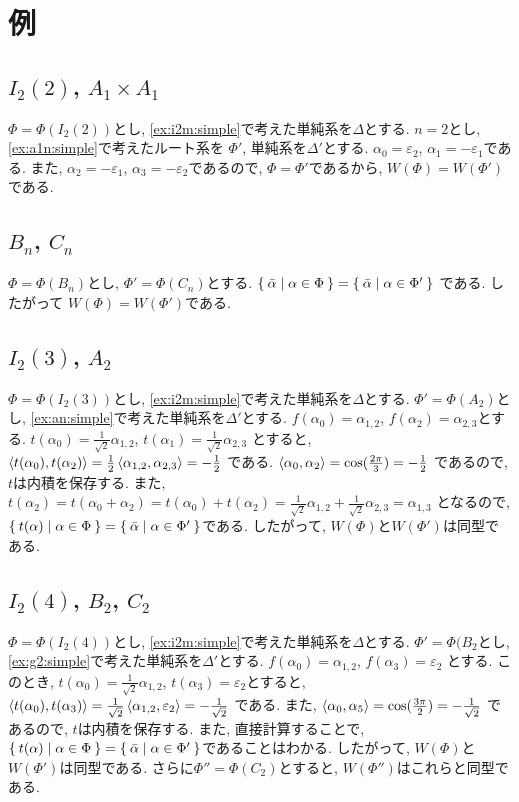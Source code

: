 \section{例}
\subsection{$I_2(2)$, $A_1\times A_1$}
$\Phi=\Phi(I_2(2))$とし,
\cref{ex:i2m:simple}で考えた単純系を$\Delta$とする.
$n=2$とし, 
\cref{ex:a1n:simple}で考えたルート系を
$\Phi'$,
単純系を$\Delta'$とする.
$\alpha_0=\varepsilon_2$,
$\alpha_1=-\varepsilon_1$である.
また,
$\alpha_2=-\varepsilon_1$,
$\alpha_3=-\varepsilon_2$であるので,
$\Phi=\Phi'$であるから, $W(\Phi)=W(\Phi')$である.

\subsection{$B_n$, $C_n$}
$\Phi=\Phi(B_n)$とし,
$\Phi'=\Phi(C_n)$とする.
$\Set{\bar\alpha|\alpha\in \Phi}=\Set{\bar\alpha|\alpha\in \Phi'}$
である.
したがって
$W(\Phi)=W(\Phi')$である.

\subsection{$I_2(3)$, $A_2$}
$\Phi=\Phi(I_2(3))$とし,
\cref{ex:i2m:simple}で考えた単純系を$\Delta$とする.
$\Phi'=\Phi(A_2)$とし,
\cref{ex:an:simple}で考えた単純系を$\Delta'$とする.
$f(\alpha_0)=\alpha_{1,2}$,
$f(\alpha_2)=\alpha_{2,3}$とする.
$t(\alpha_0)=\frac{1}{\sqrt{2}}\alpha_{1,2}$,
$t(\alpha_1)=\frac{1}{\sqrt{2}}\alpha_{2,3}$
とすると,
$\Braket{t(\alpha_0),t(\alpha_2)}=\frac{1}{2}\Braket{\alpha_{1,2},\alpha_{2,3}}=-\frac{1}{2}$
である.
$\Braket{\alpha_0,\alpha_2}=\cos(\frac{2\pi}{3})=-\frac{1}{2}$
であるので, $t$は内積を保存する.
また, $t(\alpha_{2})=t(\alpha_0+\alpha_2)=t(\alpha_0)+t(\alpha_2)=\frac{1}{\sqrt{2}}\alpha_{1,2}+\frac{1}{\sqrt{2}}\alpha_{2,3}=\alpha_{1,3}$
となるので,
$\Set{t(\alpha)|\alpha\in\Phi}=\Set{\bar\alpha|\alpha\in \Phi'}$である.
したがって, $W(\Phi)$と$W(\Phi')$は同型である.

\subsection{$I_2(4)$, $B_2$, $C_2$}
$\Phi=\Phi(I_2(4))$とし,
\cref{ex:i2m:simple}で考えた単純系を$\Delta$とする.
$\Phi'=\Phi(B_2$とし,
\cref{ex:g2:simple}で考えた単純系を$\Delta'$とする.
$f(\alpha_0)=\alpha_{1,2}$,
$f(\alpha_3)=\varepsilon_{2}$
とする.
このとき,
$t(\alpha_0)=\frac{1}{\sqrt 2}\alpha_{1,2}$,
$t(\alpha_3)=\varepsilon_2$とすると,
$\Braket{t(\alpha_0),t(\alpha_3)}=\frac{1}{\sqrt 2}\Braket{\alpha_{1,2},\varepsilon_2}=-\frac{1}{\sqrt 2}$
である. また,
$\Braket{\alpha_0,\alpha_5}=\cos(\frac{3\pi}{2})=-\frac{1}{\sqrt{2}}$
であるので, $t$は内積を保存する.
また,
直接計算することで,
$\Set{t(\alpha)|\alpha\in\Phi}=\Set{\bar\alpha|\alpha\in \Phi'}$であることはわかる.
したがって, $W(\Phi)$と$W(\Phi')$は同型である.
さらに$\Phi''=\Phi(C_2)$とすると, $W(\Phi'')$はこれらと同型である.


